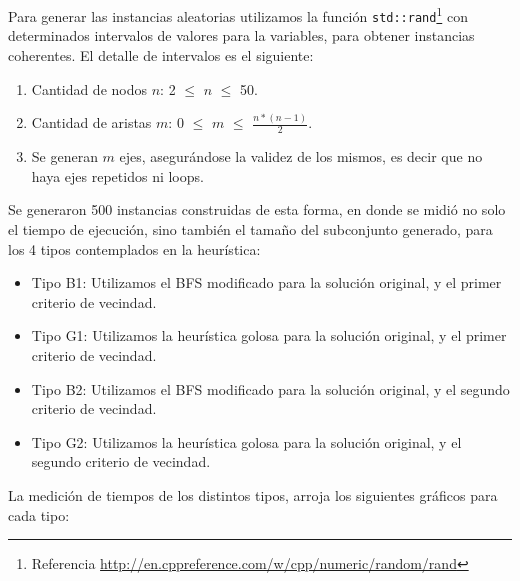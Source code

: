 Para generar las instancias aleatorias utilizamos la función \texttt{std::rand}\footnote{Referencia \url{http://en.cppreference.com/w/cpp/numeric/random/rand}} con determinados intervalos de valores para la variables, para obtener instancias coherentes. El detalle de intervalos es el siguiente:

\begin{enumerate}
	\item Cantidad de nodos $n$: 2 $\leq$ $n$ $\leq$ 50.
    \item Cantidad de aristas $m$: 0 $\leq$ $m$ $\leq$ $\frac{n*(n-1)}{2}$.
    \item Se generan $m$ ejes, asegurándose la validez de los mismos, es decir que no haya ejes repetidos ni loops.
\end{enumerate}

Se generaron 500 instancias construidas de esta forma, en donde se midió no solo el tiempo de ejecución, sino también el tamaño del subconjunto generado, para los 4 tipos contemplados en la heurística:

\begin{itemize}
	\item Tipo B1: Utilizamos el BFS modificado para la solución original, y el primer criterio de vecindad.
    \item Tipo G1: Utilizamos la heurística golosa para la solución original, y el primer criterio de vecindad.
    \item Tipo B2: Utilizamos el BFS modificado para la solución original, y el segundo criterio de vecindad.
    \item Tipo G2: Utilizamos la heurística golosa para la solución original, y el segundo criterio de vecindad.
\end{itemize}

La medición de tiempos de los distintos tipos, arroja los siguientes gráficos para cada tipo:


